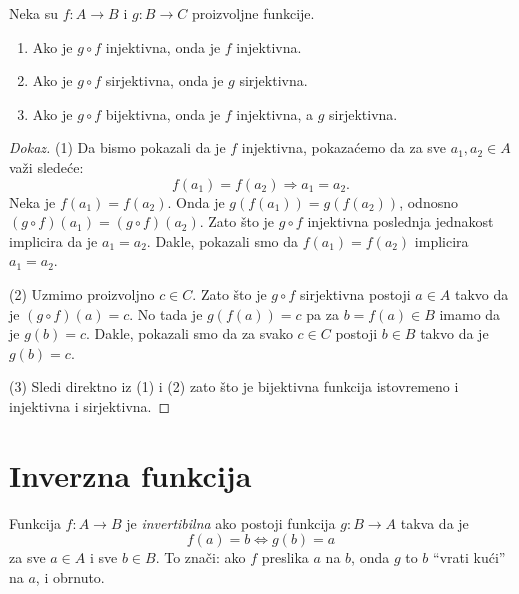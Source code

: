 \begin{THM}
  Neka su $f : A \to B$ i $g : B \to C$ proizvoljne funkcije.
  \begin{enumerate}
  \item
    Ako je $g \circ f$ injektivna, onda je $f$ injektivna.
  \item
    Ako je $g \circ f$ sirjektivna, onda je $g$ sirjektivna.
  \item
    Ako je $g \circ f$ bijektivna, onda je $f$ injektivna, a $g$ sirjektivna.
  \end{enumerate}
\end{THM}
\begin{proof}[Dokaz]
  (1)
  Da bismo pokazali da je $f$ injektivna, pokaza\'cemo da za sve $a_1, a_2 \in A$ va\v zi slede\'ce:
  $$
    f(a_1) = f(a_2) \Rightarrow a_1 = a_2.
  $$
  Neka je $f(a_1) = f(a_2)$. Onda je $g(f(a_1)) = g(f(a_2))$, odnosno $(g \circ f)(a_1) = (g \circ f)(a_2)$.
  Zato \v sto je $g \circ f$ injektivna poslednja jednakost implicira da je $a_1 = a_2$. Dakle, pokazali smo da
  $f(a_1) = f(a_2)$ implicira $a_1 = a_2$.
  
  \medskip
  
  (2)
  Uzmimo proizvoljno $c \in C$. Zato \v sto je $g \circ f$ sirjektivna postoji $a \in A$ takvo da je
  $(g \circ f)(a) = c$. No tada je $g(f(a)) = c$ pa za $b = f(a) \in B$ imamo da je $g(b) = c$.
  Dakle, pokazali smo da za svako $c \in C$ postoji $b \in B$ takvo da je $g(b) = c$.

  \medskip
  
  (3)
  Sledi direktno iz (1) i (2) zato \v sto je bijektivna funkcija istovremeno i injektivna i sirjektivna.
\end{proof}

\clearpage

\section{Inverzna funkcija}

\noindent
\begin{minipage}{3in}
  \hspace*{1.5em}Funkcija $f : A \to B$ je \emph{invertibilna} ako postoji funkcija $g : B \to A$ takva da je
  $$
    f(a) = b \Leftrightarrow g(b) = a
  $$
  za sve $a \in A$ i sve $b \in B$. To zna\v ci: ako $f$ preslika $a$ na $b$,
  onda $g$ to $b$ ``vrati ku\'ci'' na $a$, i obrnuto.
\end{minipage}
\hfill
\begin{minipage}{2.5in}
  \begin{center}
    
  \end{center}
\end{minipage}


